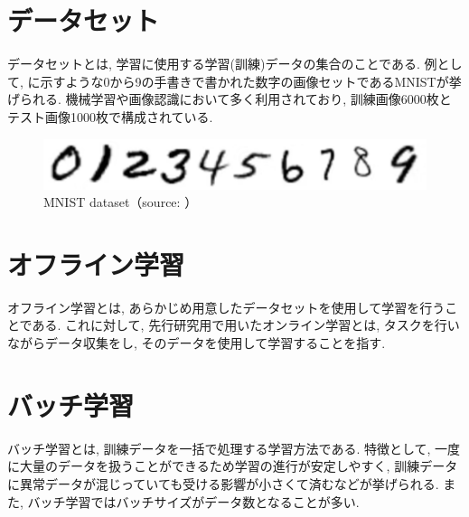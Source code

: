 \newpage
\section{データセット}
データセットとは, 学習に使用する学習(訓練)データの集合のことである. 例として, に示すような0から9の手書きで書かれた数字の画像セットであるMNISTが挙げられる. 機械学習や画像認識において多く利用されており, 訓練画像6000枚とテスト画像1000枚で構成されている. 

\vspace{5mm}

\begin{figure}[h]
     \centering
     \includegraphics[keepaspectratio, scale=0.5]
     {images/mnist.png}
     \caption{MNIST dataset（source: \cite{mnist}）}
     \label{Fig:mnist}
     \end{figure}

\section{オフライン学習}
オフライン学習とは, あらかじめ用意したデータセットを使用して学習を行うことである. これに対して, 先行研究用で用いたオンライン学習とは, タスクを行いながらデータ収集をし, そのデータを使用して学習することを指す. 

\section{バッチ学習}
バッチ学習とは, 訓練データを一括で処理する学習方法である. 特徴として, 一度に大量のデータを扱うことができるため学習の進行が安定しやすく, 訓練データに異常データが混じっていても受ける影響が小さくて済むなどが挙げられる. また, バッチ学習ではバッチサイズがデータ数となることが多い. 